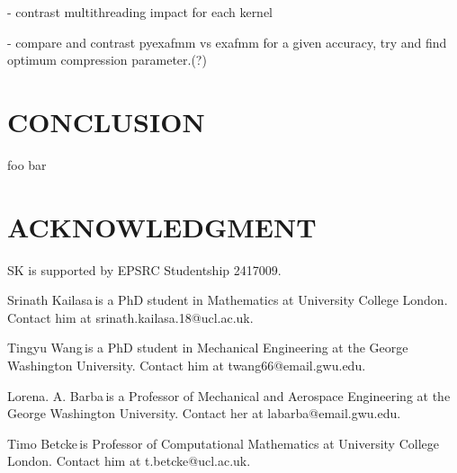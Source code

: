 \documentclass{IEEEcsmag}
\begin{document}
- contrast multithreading impact for each kernel

- compare and contrast pyexafmm vs exafmm for a given accuracy, try and find optimum compression parameter.(?)

\section{CONCLUSION}

foo bar

\section{ACKNOWLEDGMENT}

SK is supported by EPSRC Studentship 2417009.





\begin{IEEEbiography}{Srinath Kailasa}{\,}is a PhD student in Mathematics at University College London. Contact him at srinath.kailasa.18@ucl.ac.uk.
\end{IEEEbiography}

\begin{IEEEbiography}{Tingyu Wang}{\,}is a PhD student in Mechanical Engineering at the George Washington University. Contact him at twang66@email.gwu.edu.
\end{IEEEbiography}

\begin{IEEEbiography}{Lorena. A. Barba}{\,}is a Professor of Mechanical and Aerospace Engineering at the George Washington University.  Contact her at labarba@email.gwu.edu.
\end{IEEEbiography}

\begin{IEEEbiography}{Timo Betcke}{\,}is Professor of Computational Mathematics at University College London. Contact him at t.betcke@ucl.ac.uk.
\end{IEEEbiography}
\end{document}
